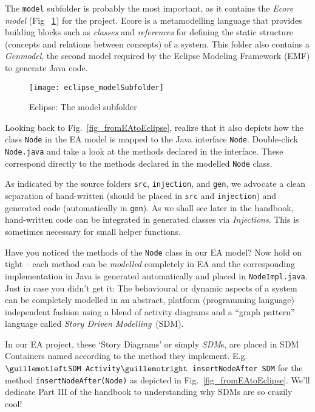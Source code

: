 The  \texttt{model} subfolder is probably the most important, as it contains the \emph{Ecore model} (Fig ~\ref{fig_modelSubfolder}) for the project. Ecore is a
metamodelling language that provides building blocks such as \emph{classes} and \emph{references} for defining the  static structure (concepts and relations
between concepts) of a system. This folder also contains a \emph{Genmodel}, the second model required by the Eclipse Modeling Framework (EMF) to generate Java
code.

\begin{figure}[htbp]
	\centering
  \texttt{[image: eclipse\_modelSubfolder]}
	\caption{Eclipse: The model subfolder}
	\label{fig_modelSubfolder}
\end{figure}


Looking back to Fig.~\ref{fig_fromEAtoEclipse}, realize that it also depicts how the class \texttt{Node} in the EA model is mapped to the Java interface
\texttt{Node}. Double-click \texttt{Node.java} and take a look at the methods declared in the interface. These correspond directly to the methods declared in
the modelled \texttt{Node} class.

As indicated by the source folders \texttt{src}, \texttt{injection}, and \texttt{gen}, we advocate a clean separation of hand-written (should be placed in
\texttt{src} and \texttt{injection}) and generated code (automatically in \texttt{gen}). As we shall see later in the handbook, hand-written code can be
integrated in generated classes via \emph{Injections}. This is sometimes necessary for small helper functions.

Have you noticed the methods of the \texttt{Node} class in our EA model?  Now hold on tight -- each method can be \emph{modelled} completely in EA and the
corresponding implementation in Java is generated automatically and placed in \texttt{NodeImpl.java}.
Just in case you didn't get it: The behavioural or dynamic aspects of a system can be completely modelled in an abstract, platform (programming language)
independent fashion using a blend of activity  diagrams and a ``graph pattern'' language called \textit{Story Driven Modelling}~(SDM).


In our EA project, these `Story Diagrams' or simply \emph{SDM}s, are placed in SDM Containers named according to the method they implement.
E.g.  \texttt{$\guillemotleft$SDM Activity$\guillemotright$ insertNodeAfter SDM} for the method  \texttt{insertNodeAfter(Node)} as depicted in
Fig.~\ref{fig_fromEAtoEclipse}.  We'll dedicate Part III of the handbook to understanding why SDMs are so  {\huge crazily} cool!

